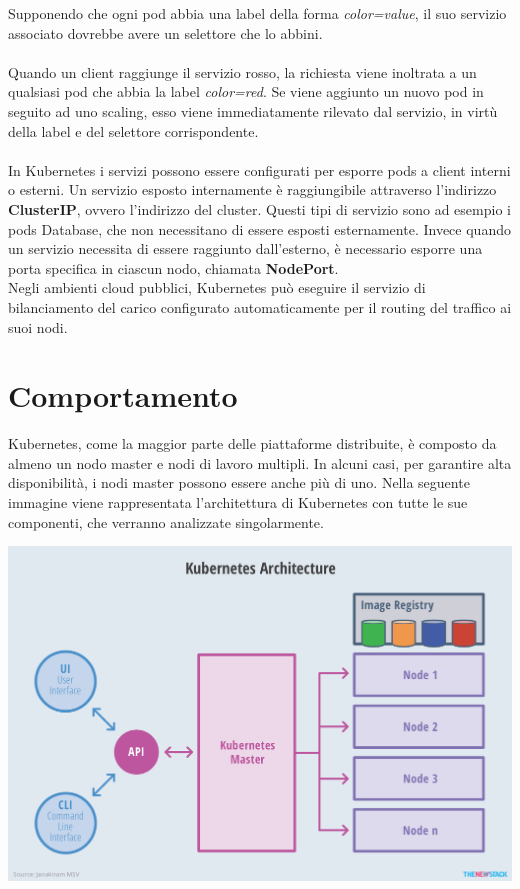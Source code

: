 \documentclass[12pt, a4paper]{report}
\begin{document}
Supponendo che ogni pod abbia una label della forma \textit{color=value}, il suo servizio associato dovrebbe avere un selettore che lo abbini.\\ \\
Quando un client raggiunge il servizio rosso, la richiesta viene inoltrata a un qualsiasi pod che abbia la label \textit{color=red}. Se viene aggiunto un nuovo pod in seguito ad uno scaling, esso viene immediatamente rilevato dal servizio, in virtù della label e del selettore corrispondente.\\ \\
In Kubernetes i servizi possono essere configurati per esporre pods a client interni o esterni. Un servizio esposto internamente è raggiungibile attraverso l'indirizzo \textbf{ClusterIP}, ovvero l'indirizzo del cluster. Questi tipi di servizio sono ad esempio i pods Database, che non necessitano di essere esposti esternamente. Invece quando un servizio necessita di essere raggiunto dall'esterno, è necessario esporre una porta specifica in ciascun nodo, chiamata \textbf{NodePort}. \\
Negli ambienti cloud pubblici, Kubernetes può eseguire il servizio di bilanciamento del carico configurato automaticamente per il routing del traffico ai suoi nodi.
\chapter{Comportamento}
Kubernetes, come la maggior parte delle piattaforme distribuite, è composto da almeno un nodo master e nodi di lavoro multipli. In alcuni casi, per garantire alta disponibilità, i nodi master possono essere anche più di uno. Nella seguente immagine viene rappresentata l'architettura di Kubernetes con tutte le sue componenti, che verranno analizzate singolarmente.
\begin{center}
  \includegraphics[scale=0.5]{Images/Kubernetes-architecture}
\end{center}
\end{document}
